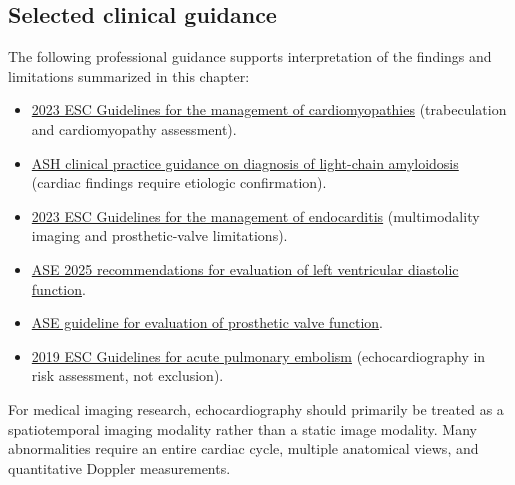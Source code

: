\subsection{Selected clinical guidance}
The following professional guidance supports interpretation of the findings and limitations summarized in this chapter:
\begin{itemize}
\item \href{https://academic.oup.com/eurheartj/article/44/37/3503/7246608}{2023 ESC Guidelines for the management of cardiomyopathies} (trabeculation and cardiomyopathy assessment).
\item \href{https://ashpublications.org/bloodadvances/article/doi/10.1182/bloodadvances.2025017073/566264}{ASH clinical practice guidance on diagnosis of light-chain amyloidosis} (cardiac findings require etiologic confirmation).
\item \href{https://academic.oup.com/eurheartj/article/44/39/3948/7243107}{2023 ESC Guidelines for the management of endocarditis} (multimodality imaging and prosthetic-valve limitations).
\item \href{https://www.asecho.org/wp-content/uploads/2025/07/Left-Ventricular-Diastolic-Function.pdf}{ASE 2025 recommendations for evaluation of left ventricular diastolic function}.
\item \href{https://www.asecho.org/wp-content/uploads/2024/01/PIIS0894731723005333.pdf}{ASE guideline for evaluation of prosthetic valve function}.
\item \href{https://academic.oup.com/eurheartj/article/41/4/543/5556136}{2019 ESC Guidelines for acute pulmonary embolism} (echocardiography in risk assessment, not exclusion).
\end{itemize}

For medical imaging research, echocardiography should primarily be treated as a spatiotemporal imaging modality rather than a static image modality. Many abnormalities require an entire cardiac cycle, multiple anatomical views, and quantitative Doppler measurements.

